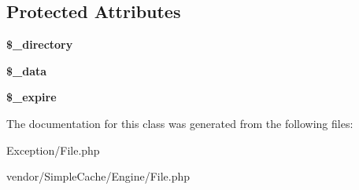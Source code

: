 \subsection*{Protected Attributes}
\begin{DoxyCompactItemize}
\item 
\hypertarget{classFile_ae3df9c154752d7a5892b5529cd58a59f}{
{\bfseries \$\_\-directory}}
\label{classFile_ae3df9c154752d7a5892b5529cd58a59f}

\item 
\hypertarget{classFile_a51d172324315d4db733bee91ee2f6109}{
{\bfseries \$\_\-data}}
\label{classFile_a51d172324315d4db733bee91ee2f6109}

\item 
\hypertarget{classFile_a947907f0953f4d5a88b8df5bf7402aa2}{
{\bfseries \$\_\-expire}}
\label{classFile_a947907f0953f4d5a88b8df5bf7402aa2}

\end{DoxyCompactItemize}


The documentation for this class was generated from the following files:\begin{DoxyCompactItemize}
\item 
Exception/File.php\item 
vendor/SimpleCache/Engine/File.php\end{DoxyCompactItemize}
